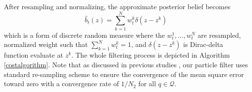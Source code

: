 \documentclass[letterpaper, 10 pt, conference]{ieeeconf}
\begin{document}

After resampling and normalizing, the approximate posterior belief becomes
\begin{equation}
\hat{b}_t(z) = \sum_{k=1}^{N} 
w_t^{k} \delta(z - z^{k})
\end{equation}
which is a form of discrete random measure where the $w_t^1,\dots,w_t^N$ are resampled, normalized weight such that $\sum_{k=1}^{N} w_t^{k} = 1$, and $\delta(z - z^{k})$ is Dirac-delta function evaluate at $z^{k}$. 
The whole filtering process is depicted in Algorithm \ref{costalgorithm}.
Note that as discussed in previous studies \cite{crisan2002survey}, our particle filter uses standard re-sampling scheme to ensure the convergence of the mean square error toward zero with a convergence rate of $1/N_2$ for all $q \in \mathcal{Q}$. 
\end{document}
